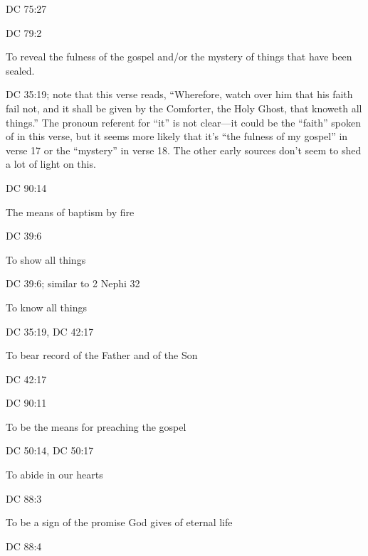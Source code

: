 \begin{compactitem}
\begin{compactitem}
					\item DC 75:27
					\item DC 79:2
				\end{compactitem}
			\item To reveal the fulness of the gospel and/or the mystery of things that have been sealed.
				\begin{compactitem}
					\item DC 35:19; note that this verse reads, ``Wherefore, watch over him that his faith fail not, and it shall be given by the Comforter, the Holy Ghost, that knoweth all things.'' The pronoun referent for ``it'' is not clear---it could be the ``faith'' spoken of in this verse, but it seems more likely that it's ``the fulness of my gospel'' in verse 17 or the ``mystery'' in verse 18. The other early sources don't seem to shed a lot of light on this.
					\item DC 90:14
				\end{compactitem}
			\item The means of baptism by fire
				\begin{compactitem}
					\item DC 39:6
				\end{compactitem}
			\item To show all things
				\begin{compactitem}
					\item DC 39:6; similar to 2 Nephi 32
				\end{compactitem}
			\item To know all things
				\begin{compactitem}
					\item DC 35:19, DC 42:17
				\end{compactitem} 
			\item To bear record of the Father and of the Son
				\begin{compactitem}
					\item DC 42:17
					\item DC 90:11
				\end{compactitem}
			\item To be the means for preaching the gospel
				\begin{compactitem}
					\item DC 50:14, DC 50:17
				\end{compactitem}
			\item To abide in our hearts
				\begin{compactitem}
					\item DC 88:3
				\end{compactitem}
			\item To be a sign of the promise God gives of eternal life
				\begin{compactitem}
					\item DC 88:4
				\end{compactitem}
		\end{compactitem}